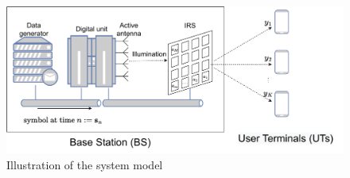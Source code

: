 \documentclass[12pt,draftclsnofoot,onecolumn,journal]{IEEEtran}
\newcommand{\cmt}[1]{\textcolor{red}{#1} }
\begin{document}

\begin{figure}[htbp]\flushleft
	\includegraphics[width=6in]{sysmodel_illustration.pdf} 
	\caption{Illustration of the system model} \label{fig:sysmodel_illustration}
\end{figure}
\end{document}
